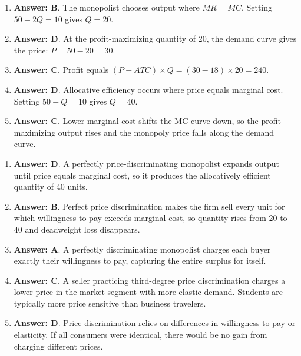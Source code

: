\documentclass[10pt]{article}
\begin{document}
\begin{enumerate}[resume*=aps, leftmargin=*, itemsep=0.6em, topsep=0.2em, parsep=0pt]
\item \textbf{Answer: B}. The monopolist chooses output where $MR=MC$. Setting $50-2Q = 10$ gives $Q=20$.
\item \textbf{Answer: D}. At the profit-maximizing quantity of 20, the demand curve gives the price: $P = 50 - 20 = 30$.
\item \textbf{Answer: C}. Profit equals $(P-ATC)\times Q = (30-18)\times 20 = 240$.
\item \textbf{Answer: D}. Allocative efficiency occurs where price equals marginal cost. Setting $50-Q = 10$ gives $Q=40$.
\item \textbf{Answer: C}. Lower marginal cost shifts the MC curve down, so the profit-maximizing output rises and the monopoly price falls along the demand curve.
\end{enumerate}
\begin{enumerate}[resume*=aps, leftmargin=*, itemsep=0.6em, topsep=0.2em, parsep=0pt]
\item \textbf{Answer: D}. A perfectly price-discriminating monopolist expands output until price equals marginal cost, so it produces the allocatively efficient quantity of 40 units.
\item \textbf{Answer: B}. Perfect price discrimination makes the firm sell every unit for which willingness to pay exceeds marginal cost, so quantity rises from 20 to 40 and deadweight loss disappears.
\item \textbf{Answer: A}. A perfectly discriminating monopolist charges each buyer exactly their willingness to pay, capturing the entire surplus for itself.
\item \textbf{Answer: C}. A seller practicing third-degree price discrimination charges a lower price in the market segment with more elastic demand. Students are typically more price sensitive than business travelers.
\item \textbf{Answer: D}. Price discrimination relies on differences in willingness to pay or elasticity. If all consumers were identical, there would be no gain from charging different prices.
\end{enumerate}
\end{document}
